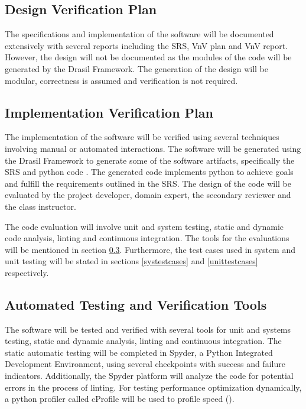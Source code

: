 \documentclass[12pt, titlepage]{article}
\begin{document}
\subsection{Design Verification Plan}

The specifications and implementation of the software will be documented 
extensively with several reports including the SRS, VnV plan and VnV report. 
However, the design will not be documented as the modules of the code will be 
generated by the Drasil Framework. The generation of the design will be modular, 
correctness is assumed and verification is not required.

\subsection{Implementation Verification Plan}

The implementation of the software will be verified using several techniques 
involving manual or automated interactions. The software will be generated using 
the Drasil Framework to generate some of the software artifacts, specifically 
the SRS and python code \citep{Drasil}. The generated code implements python to 
achieve goals and fulfill the requirements outlined in the SRS. The 
design of the code will be evaluated by the project developer, domain expert, 
the secondary reviewer and the class instructor. 

The code evaluation will involve unit and system testing, static and dynamic 
code analysis, linting and continuous integration. The tools for the evaluations 
will be mentioned in section \ref{tools}. Furthermore, the test cases used in 
system and unit testing will be stated in sections \ref{systestcases} and 
\ref{unittestcases} respectively. 


\subsection{Automated Testing and Verification Tools}\label{tools}

The \progname{} software will be tested and verified with several tools for 
unit and systems testing, static and dynamic analysis, linting and continuous 
integration. The static automatic testing will be completed in Spyder, a Python 
Integrated Development Environment, using several checkpoints with success and 
failure indicators. Additionally, the Spyder platform will analyze the code for 
potential errors in the process of linting. For testing performance optimization 
dynamically, a python profiler called cProfile will be used to profile speed 
(\citet{cProfile}).
\end{document}
